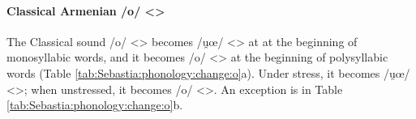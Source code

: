 \begin{table}[H]
	\centering 
	\caption{Change from Classical Armenian /e/ <> to /je, e, æ, i̯e/ <, > in the Sebastia dialect}
	\label{tab:Sebastia:phonology:change:e}
\end{table}


\paragraph{Classical Armenian /o/ <>}



The Classical sound /o/ <> becomes /u̯œ/ <> at at the beginning of monosyllabic words, and it becomes /o/ <> at the beginning of polysyllabic words (Table \ref{tab:Sebastia:phonology:change:o}a). Under stress, it becomes /u̯œ/ <>; when unstressed, it becomes /o/ <>. An exception is in Table \ref{tab:Sebastia:phonology:change:o}b. 





